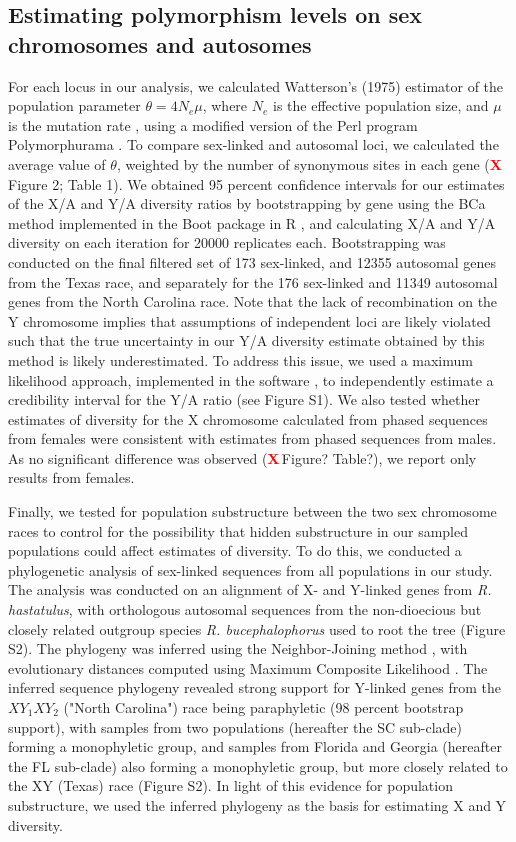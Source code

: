 \documentclass[9pt,twocolumn,twoside]{gsajnl}
\newcommand{\X}{\textcolor{red}{\bf X\,}}
\begin{document}
\subsection*{Estimating polymorphism levels on sex chromosomes and autosomes}
For each locus in our analysis, we calculated Watterson’s (1975) estimator of the population parameter $\theta=4N_{e}\mu$, where $N_{e}$ is the effective population size, and $\mu$ is the mutation rate \citep{watterson1975}, using a modified version of the Perl program Polymorphurama \citep{bachtrog2006}. To compare sex-linked and autosomal loci, we calculated the average value of $\theta$, weighted by the number of synonymous sites in each gene (\X Figure 2; Table 1). We obtained 95 percent confidence intervals for our estimates of the X/A and Y/A diversity ratios by bootstrapping by gene using the BCa method \citep{efron1994} implemented in the Boot package in R \citep{canty2012boot}, and calculating X/A and Y/A diversity on each iteration for 20000 replicates each. Bootstrapping was conducted on the final filtered set of 173 sex-linked, and 12355 autosomal genes from the Texas race, and separately for the 176 sex-linked and 11349 autosomal genes from the North Carolina race. Note that the lack of recombination on the Y chromosome implies that assumptions of independent loci are likely violated such that the true uncertainty in our Y/A diversity estimate obtained by this method is likely underestimated. To address this issue, we used a maximum likelihood approach, implemented in the software \citep{wright2004hka}, to independently estimate a credibility interval for the Y/A ratio (see Figure S1). We also tested whether estimates of diversity for the X chromosome calculated from phased sequences from females were consistent with estimates from phased sequences from males. As no significant difference was observed (\X Figure? Table?), we report only results from females.

Finally, we tested for population substructure between the two sex chromosome races to control for the possibility that hidden substructure in our sampled populations could affect estimates of diversity. To do this, we conducted a phylogenetic analysis of sex-linked sequences from all populations in our study. The analysis was conducted on an alignment of X- and Y-linked genes from \textit{R. hastatulus}, with orthologous autosomal sequences from the non-dioecious but closely related outgroup species \textit{R. bucephalophorus} used to root the tree (Figure S2). The phylogeny was inferred using the Neighbor-Joining method \citep{saitou1987neighbor}, with evolutionary distances computed using Maximum Composite Likelihood \citep{tamura2011mega5}. The inferred sequence phylogeny revealed strong support for Y-linked genes from the $XY_{1}XY_{2}$ ("North Carolina") race being paraphyletic (98 percent bootstrap support), with samples from two populations (hereafter the SC sub-clade) forming a monophyletic group, and samples from Florida and Georgia (hereafter the FL sub-clade) also forming a monophyletic group, but more closely related to the XY (Texas) race (Figure S2). In light of this evidence for population substructure, we used the inferred phylogeny as the basis for estimating X and Y diversity.  
\end{document}
